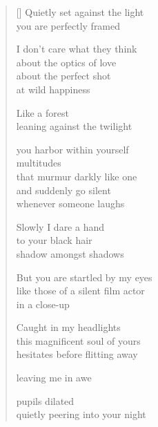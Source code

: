 \documentclass[12pt,a4paper]{article}
\begin{document}
\begin{verse}[\versewidth]
  Quietly set against the light \\
  you are perfectly framed

  I don't care what they think \\
  about the optics of love \\
  about the perfect shot \\
  at wild happiness

  Like a forest \\
  leaning against the twilight

  you harbor within yourself \\
  multitudes \\
  that murmur darkly like one \\
  and suddenly go silent \\
  whenever someone laughs

  Slowly I dare a hand \\
  to your black hair \\
  shadow amongst shadows

  But you are startled by my eyes \\
  like those of a silent film actor \\
  in a close-up

  Caught in my headlights \\
  this magnificent soul of yours \\
  hesitates before flitting away

  leaving me in awe

  pupils dilated \\
  quietly peering into your night
\end{verse}


\newpage

\poemtitle{}

\settowidth{\versewidth}{yet better off than broken up}

\bigskip
\end{document}
